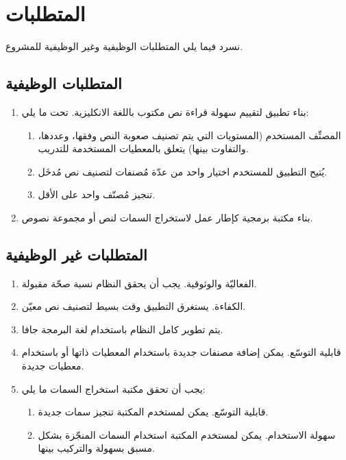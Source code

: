 \section{المتطلبات}
نسرد فيما يلي المتطلبات الوظيفية وغير الوظيفية للمشروع.

\subsection{المتطلبات الوظيفية}

\begin{enumerate}
	\item 
	بناء تطبيق لتقييم سهولة قراءة نص مكتوب باللغة الانكليزية. تحت ما يلي:
	\begin{enumerate}
		\item 
		المصنِّف المستخدم (المستويات التي يتم تصنيف صعوبة النص وفقها، وعددها، والتفاوت بينها)
		يتعلق بالمعطيات المستخدمة للتدريب.
		\item 
		يُتيح التطبيق للمستخدم اختيار واحد من عدّة مُصنفات لتصنيف نص مُدخَل.
		\item 
		تنجيز مُصنّف واحد على الأقل.
	\end{enumerate}

	\item 
	بناء مكتبة برمجية كإطار عمل لاستخراج السمات لنص أو مجموعة نصوص.
\end{enumerate}




\subsection{المتطلبات غير الوظيفية}
\begin{enumerate}
	\item 
	الفعاليّة والوثوقية. يجب أن يحقق النظام نسبة صحّة مقبولة.
	\item 
	الكفاءة. يستغرق التطبيق وقت بسيط لتصنيف نص معيّن.
	\item 
	يتم تطوير كامل النظام باستخدام لغة البرمجة جافا.
	\item 
	قابلية التوسّع. يمكن إضافة مصنفات جديدة باستخدام المعطيات ذاتها أو باستخدام معطيات جديدة.
	\item 
	يجب أن تحقق مكتبة استخراج السمات ما يلي:
	\begin{enumerate}
		\item 
		قابلية التوسّع. يمكن لمستخدم المكتبة تنجيز سمات جديدة.
		\item
		سهولة الاستخدام. يمكن لمستخدم المكتبة استخدام السمات المنجّزة بشكل مسبق بسهولة والتركيب بينها.
	\end{enumerate}

\end{enumerate}



